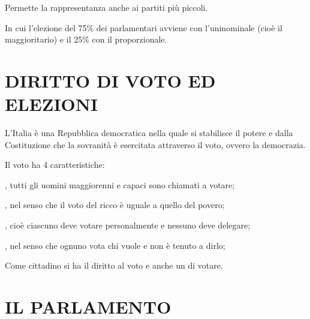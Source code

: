 \documentclass[letterpaper,10pt,italian]{sphinxmanual}
\begin{document}
\sphinxAtStartPar
Permette la rappresentanza anche ai partiti più piccoli.

\sphinxAtStartPar
{}

\sphinxAtStartPar
In cui l’elezione del 75\% dei parlamentari avviene con l’uninominale (cioè il maggioritario) e il 25\% con il
proporzionale.

\sphinxstepscope


\chapter{DIRITTO DI VOTO ED ELEZIONI}
\label{\detokenize{Diritto di voto ed elezioni:diritto-di-voto-ed-elezioni}}\label{\detokenize{Diritto di voto ed elezioni::doc}}
\begin{figure}[htbp]
\centering

\noindent{}
\end{figure}

\sphinxAtStartPar
L’Italia è una Repubblica democratica nella quale si stabilisce il potere e dalla Costituzione
che la sovranità è esercitata attraverso il voto, ovvero la democrazia.

\sphinxAtStartPar
Il voto ha 4 caratteristiche:

\sphinxAtStartPar
{}, tutti gli uomini maggiorenni e capaci sono chiamati a votare;

\sphinxAtStartPar
{}, nel senso che il voto del ricco è uguale a quello del povero;

\sphinxAtStartPar
{}, cioè ciascuno deve votare personalmente e nessuno deve delegare;

\sphinxAtStartPar
{}, nel senso che ognuno vota chi vuole e non è tenuto a dirlo;

\sphinxAtStartPar
Come cittadino si ha il diritto al voto e anche un  di votare.

\sphinxstepscope


\chapter{IL PARLAMENTO}
\label{\detokenize{IL PARLAMENTO:il-parlamento}}\label{\detokenize{IL PARLAMENTO::doc}}
\begin{figure}[htbp]
\centering

\noindent{}
\end{figure}
\end{document}
